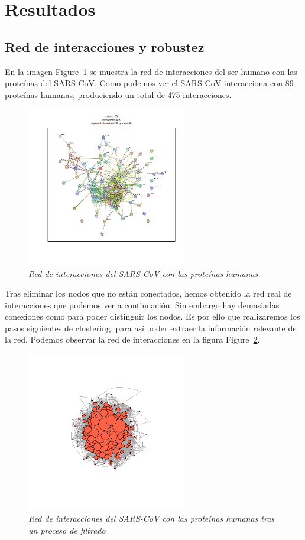 \section{Resultados}

\subsection{Red de interacciones y robustez}

En la imagen Figure~\ref{stringhits} se muestra la red de interacciones del ser humano con las proteínas del SARS-CoV. Como podemos ver el SARS-CoV interacciona con 89 proteínas humanas, produciendo un total de 475 interacciones. 

\begin{figure}[h]
	\centering
		\includegraphics[width=70mm,scale=1.2]{figures/string_hits.png}
		\caption{\textit{Red de interacciones del SARS-CoV con las proteínas humanas}}
		\label{stringhits}
\end{figure}

Tras eliminar los nodos que no están conectados, hemos obtenido la red real de interacciones que podemos ver a continuación. Sin embargo hay demasiadas conexiones como para poder distinguir los nodos. Es por ello que realizaremos los pasos siguientes de clustering, para así poder extraer la información relevante de la red. Podemos observar la red de interacciones en la figura Figure~\ref{hitsnetwork}.

\begin{figure}[h]
	\centering
		\includegraphics[width=70mm,scale=1.2]{figures/hits.network_graph.png}
		\caption{\textit{Red de interacciones del SARS-CoV con las proteínas humanas tras un proceso de filtrado}}
		\label{hitsnetwork}
\end{figure}


